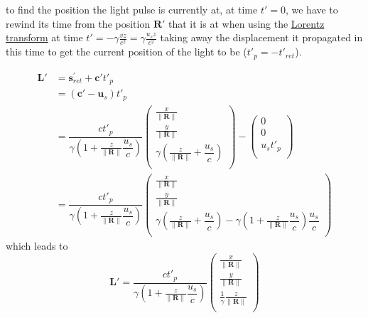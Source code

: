 to find the position the light pulse is currently at, at time ${t{'}} = 0$, we have to rewind its time from the position $\mathbf{R}{'}$ that it is at when using the \hyperlink{def-lorentz-transform}{Lorentz transform} at time ${t{'}} =-{\gamma}\frac{{v}{z}}{{c}^2} = {\gamma}\frac{u_s z}{{c}^2}$ taking away the displacement it propagated in this time to get the current position of the light to be (${t{'}_{p}} =-{t{'}_{ret}}$).

\begin{equation}
	\begin{split}
		\mathbf{L}{'}
		 & = \mathbf{s}_{ret}^{'} + \mathbf{c}{'}t{'}_{p}
		\\
		 & = \left( \mathbf{c}{'}-\mathbf{u}_s \right)t{'}_{p}
		\\
		 & = \dfrac{{c}t{'}_{p}}{{\gamma}\left(1 + \frac{z}{\|\mathbf{R}\|} \dfrac{u_s}{c} \right)}
		\begin{pmatrix}
			\frac{x}{\|\mathbf{R}\|}                                          \\
			\frac{y}{\|\mathbf{R}\|}                                          \\
			{\gamma} \left( \frac{z}{\|\mathbf{R}\|} + \dfrac{u_s}{c} \right) \\
		\end{pmatrix}
		-
		\begin{pmatrix}
			0              \\
			0              \\
			u_s {t{'}_{p}} \\
		\end{pmatrix}
		\\
		 & = \dfrac{{c}t{'}_{p}}{{\gamma}\left(1 + \frac{z}{\|\mathbf{R}\|} \dfrac{u_s}{c} \right)}
		\begin{pmatrix}
			\frac{x}{\|\mathbf{R}\|}                                                                                                                           \\
			\frac{y}{\|\mathbf{R}\|}                                                                                                                           \\
			{\gamma} \left( \frac{z}{\|\mathbf{R}\|} + \dfrac{u_s}{c} \right)-{\gamma}\left(1 + \frac{z}{\|\mathbf{R}\|} \dfrac{u_s}{c} \right) \dfrac{u_s}{c} \\
		\end{pmatrix}
	\end{split}
\end{equation}
which leads to
\begin{equation}
	\mathbf{L}{'} = \dfrac{{c}t{'}_{p}}{{\gamma}\left(1 + \frac{z}{\|\mathbf{R}\|} \dfrac{u_s}{c} \right)}
	\begin{pmatrix}
		\frac{x}{\|\mathbf{R}\|}                    \\
		\frac{y}{\|\mathbf{R}\|}                    \\
		\frac{1}{{\gamma}} \frac{z}{\|\mathbf{R}\|} \\
	\end{pmatrix}
\end{equation}

